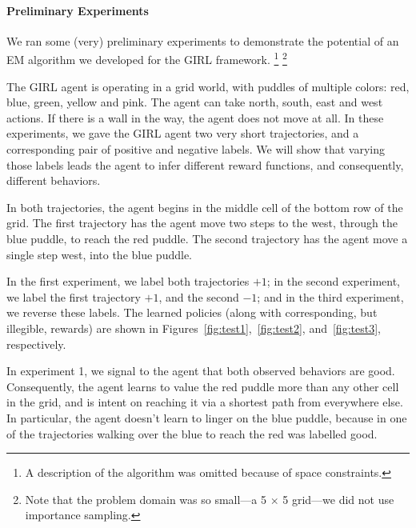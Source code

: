
\vspace{\up}
\paragraph{Preliminary Experiments}

We ran some (very) preliminary experiments to demonstrate the
potential of an EM algorithm we developed for the GIRL framework.%
\footnote{A description of the algorithm was omitted because of space constraints.}
\footnote{Note that the problem domain was so small---a 5 $\times$ 5 grid---we did not use importance sampling.}

The GIRL agent is operating in a grid world, with puddles of multiple
colors: red, blue, green, yellow and pink. The agent can take north,
south, east and west actions.  If there is a wall in the way, the
agent does not move at all.
In these experiments, we gave the GIRL agent two very short
trajectories, and a corresponding pair of positive and negative
labels.  We will show that varying those labels leads the agent to
infer different reward functions, and consequently, different
behaviors.

In both trajectories, the agent begins in the middle cell of the
bottom row of the grid.  The first trajectory has the agent move two
steps to the west, through the blue puddle, to reach the red puddle.
The second trajectory has the agent move a single step west, into the
blue puddle.


In the first experiment, we label both trajectories $+1$; in the
second experiment, we label the first trajectory $+1$, and the second
$-1$; and in the third experiment, we reverse these labels.  The
learned policies (along with corresponding, but illegible, rewards)
are shown in Figures~\ref{fig:test1},~\ref{fig:test2},
and~\ref{fig:test3}, respectively.

In experiment 1, we signal to the agent that both observed behaviors
are good.  Consequently, the agent learns to value the red puddle more
than any other cell in the grid, and is intent on reaching it via a
shortest path from everywhere else.  In particular, the agent doesn't
learn to linger on the blue puddle, because in one of the trajectories
walking over the blue to reach the red was labelled good.

